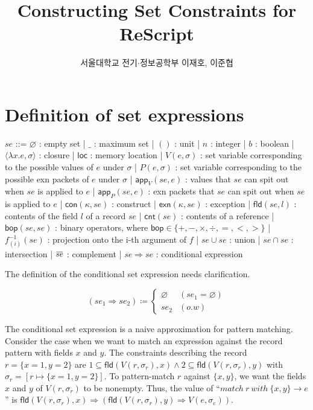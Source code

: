 \documentclass{article}
\title{Constructing Set Constraints for ReScript}
\author{서울대학교 전기$\cdot$정보공학부 이재호, 이준협}
\date{}
\newcommand{\loverbar}[1]{\mkern 1.5mu\overline{\mkern-1.5mu#1\mkern-1.5mu}\mkern 1.5mu}
\begin{document}
\maketitle
\section{Definition of set expressions}
\begin{bnfgrammar}
  $se$ ::= $\varnothing$ : empty set
  | $\_$ : maximum set
  | $()$ : unit
  | $n$ : integer
  | $b$ : boolean
  | $\langle\lambda x.e,\sigma\rangle$ : closure
  | $\mathsf{loc}$ : memory location
  | $V(e,\sigma)$ : set variable corresponding to the possible values of $e$ under $\sigma$
  | $P(e,\sigma)$ : set variable corresponding to the possible exn packets of $e$ under $\sigma$
  | $\mathsf{app}_{V}(se,e)$ : values that $se$ can spit out when $se$ is applied to $e$
  | $\mathsf{app}_{P}(se,e)$ : exn packets that $se$ can spit out when $se$ is applied to $e$
  | $\mathsf{con}(\kappa,se)$ : construct
  | $\mathsf{exn}(\kappa,se)$ : exception
  | $\mathsf{fld}(se, l)$ : contents of the field $l$ of a record $se$
  | $\mathsf{cnt}(se)$ : contents of a reference
  | $\mathsf{bop}(se, se)$ : binary operators, where $\mathsf{bop}\in\{+, -, \times, \div, =, <, >\}$
  | $f^{-1}_{(i)}(se)$ : projection onto the i-th argument of $f$
  | $se \cup se$ : union
  | $se \cap se$ : intersection
  | $\loverbar{se}$ : complement
  | $se \Rightarrow se$ : conditional expression
\end{bnfgrammar}

The definition of the conditional set expression needs clarification.

\[
  (se_{1} \Rightarrow se_{2}) \coloneq
  \begin{cases}
    \varnothing & (se_{1}=\varnothing)\\
    se_{2} & (o.w)
  \end{cases}
\]

The conditional set expression is a naive approximation for pattern matching. Consider the case when we want to match an expression against the record pattern with fields $x$ and $y$.
The constraints describing the record $r = \{x = 1, y = 2\}$ are $1 \subseteq \mathsf{fld}(V(r,\sigma_{r}), x) \wedge 2 \subseteq \mathsf{fld}(V(r,\sigma_{r}), y)$ with $\sigma_{r}=[r\mapsto\{x=1, y=2\}]$.
To pattern-match $r$ against $\{x, y\}$, we want the fields $x$ and $y$ of $V(r,\sigma_{r})$ to be nonempty.
Thus, the value of ``$match\:r\:with\:\{x, y\}\rightarrow e$'' is $\mathsf{fld}(V(r,\sigma_{r}), x)\Rightarrow(\mathsf{fld}(V(r,\sigma_{r}),y)\Rightarrow V(e,\sigma_{e}))$.
\end{document}
